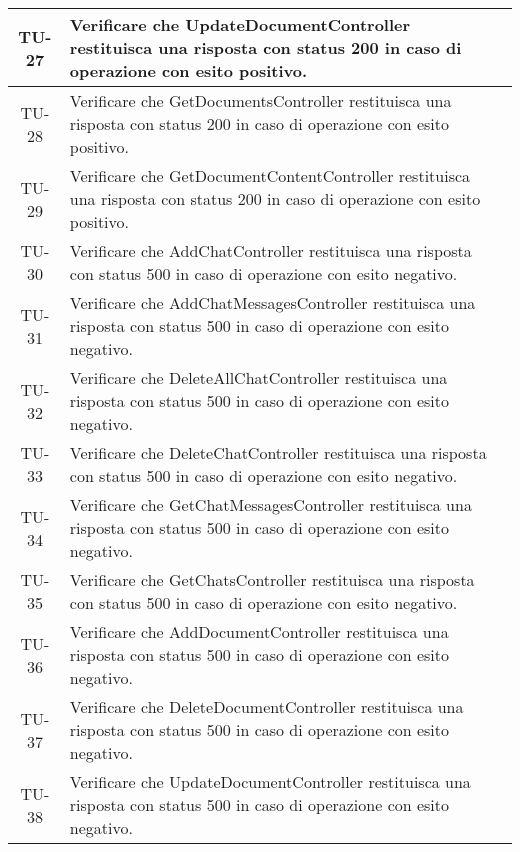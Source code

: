 \begin{xltabular}{\textwidth}{| c | X | c |}
    \hline
    TU-27 & Verificare che UpdateDocumentController restituisca una risposta con status 200 in caso di operazione con esito positivo. & \textcolor{cmarkcolor}{} \\
    \hline
    TU-28 & Verificare che GetDocumentsController restituisca una risposta con status 200 in caso di operazione con esito positivo. & \textcolor{cmarkcolor}{} \\
    \hline
    TU-29 & Verificare che GetDocumentContentController restituisca una risposta con status 200 in caso di operazione con esito positivo. & \textcolor{cmarkcolor}{} \\
    \hline
    TU-30 & Verificare che AddChatController restituisca una risposta con status 500 in caso di operazione con esito negativo. & \textcolor{cmarkcolor}{} \\
    \hline
    TU-31 & Verificare che AddChatMessagesController restituisca una risposta con status 500 in caso di operazione con esito negativo. & \textcolor{cmarkcolor}{} \\
    \hline
    TU-32 & Verificare che DeleteAllChatController restituisca una risposta con status 500 in caso di operazione con esito negativo. & \textcolor{cmarkcolor}{} \\
    \hline
    TU-33 & Verificare che DeleteChatController restituisca una risposta con status 500 in caso di operazione con esito negativo. & \textcolor{cmarkcolor}{} \\
    \hline
    TU-34 & Verificare che GetChatMessagesController restituisca una risposta con status 500 in caso di operazione con esito negativo. & \textcolor{cmarkcolor}{} \\
    \hline
    TU-35 & Verificare che GetChatsController restituisca una risposta con status 500 in caso di operazione con esito negativo. & \textcolor{cmarkcolor}{} \\
    \hline
    TU-36 & Verificare che AddDocumentController restituisca una risposta con status 500 in caso di operazione con esito negativo. & \textcolor{cmarkcolor}{} \\
    \hline
    TU-37 & Verificare che DeleteDocumentController restituisca una risposta con status 500 in caso di operazione con esito negativo. & \textcolor{cmarkcolor}{} \\
    \hline
    TU-38 & Verificare che UpdateDocumentController restituisca una risposta con status 500 in caso di operazione con esito negativo. & \textcolor{cmarkcolor}{} \\

\end{xltabular}
